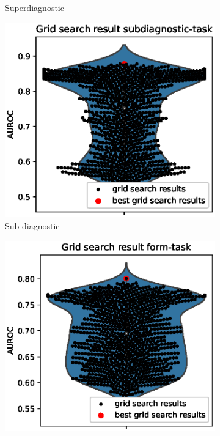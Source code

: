 \begin{figure}[hp]
\begin{subfigure}[b]{0.45\textwidth}
        \caption{Superdiagnostic}
        \label{fig:gridsearch_superdiag}
     \end{subfigure}
     \hfill
      \begin{subfigure}[b]{0.45\textwidth}
        \includegraphics[width=1.0\textwidth]{images/violinsubdiagnostic.eps}
        \caption{Sub-diagnostic}
        \label{fig:gridsearch_subdiag}
     \end{subfigure}
     \hfill
     \begin{subfigure}[b]{0.45\textwidth}
        \includegraphics[width=1.0\textwidth]{images/violinform.eps}

\end{subfigure}
\end{figure}
